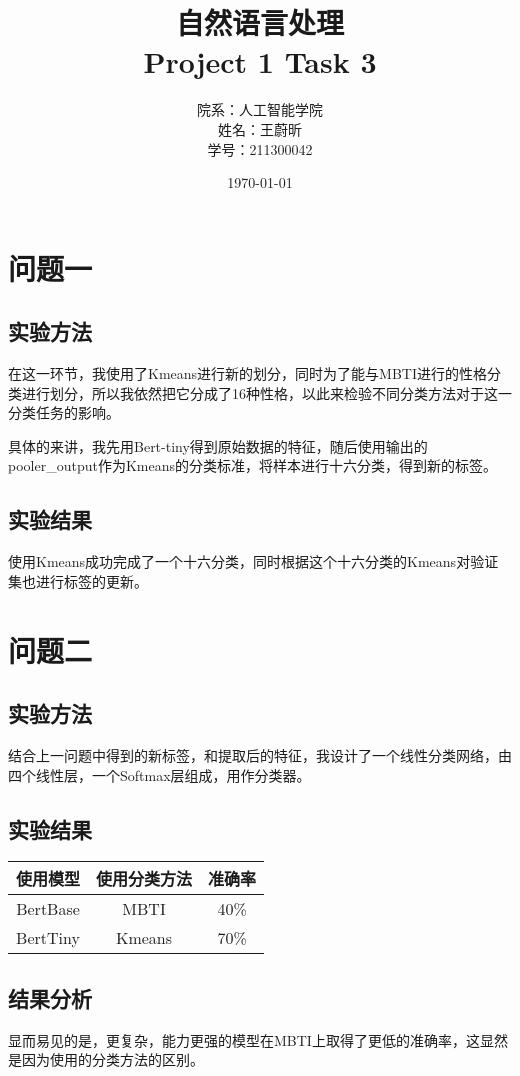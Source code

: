 \documentclass{article}
\title{\huge  自然语言处理\\ \large Project 1 Task 3}
\author{院系：人工智能学院\\姓名：王蔚昕\\学号：211300042}
\date{\today}
\begin{document}
	\maketitle
	\newpage
	\tableofcontents
	\newpage
	\section{问题一}
	\subsection{实验方法}
	在这一环节，我使用了Kmeans进行新的划分，同时为了能与MBTI进行的性格分类进行划分，所以我依然把它分成了16种性格，以此来检验不同分类方法对于这一分类任务的影响。
	
	具体的来讲，我先用Bert-tiny得到原始数据的特征，随后使用输出的pooler\_output作为Kmeans的分类标准，将样本进行十六分类，得到新的标签。
	\subsection{实验结果}
	使用Kmeans成功完成了一个十六分类，同时根据这个十六分类的Kmeans对验证集也进行标签的更新。
	\section{问题二}
	\subsection{实验方法}
	结合上一问题中得到的新标签，和提取后的特征，我设计了一个线性分类网络，由四个线性层，一个Softmax层组成，用作分类器。
	\subsection{实验结果}
	\begin{table}[H]
		\begin{tabular}{ccc}
			\toprule
			使用模型 & 使用分类方法 & 准确率 \\
			\hline
			BertBase & MBTI & 40\% \\
			BertTiny & Kmeans & 70\%\\
			\bottomrule
		\end{tabular}
		\centering
	\end{table}
	\subsection{结果分析}
	显而易见的是，更复杂，能力更强的模型在MBTI上取得了更低的准确率，这显然是因为使用的分类方法的区别。
\end{document}
